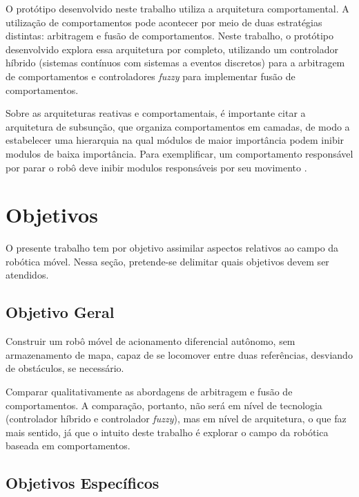 O protótipo desenvolvido neste trabalho utiliza a arquitetura comportamental. A 
utilização de comportamentos pode acontecer por meio de duas estratégias distintas: 
arbitragem e fusão de comportamentos. Neste trabalho, o protótipo desenvolvido
explora essa arquitetura por completo, utilizando um controlador híbrido (sistemas 
contínuos com sistemas a eventos discretos) para a arbitragem de comportamentos e 
controladores \textit{fuzzy} para implementar fusão de comportamentos.  

Sobre as arquiteturas reativas e comportamentais, é importante citar a arquitetura 
de subsunção, que organiza comportamentos em camadas, de modo a estabelecer uma 
hierarquia na qual módulos de maior importância podem inibir modulos de baixa 
importância. Para exemplificar, um comportamento responsável por parar o robô deve 
inibir modulos responsáveis por seu movimento \cite{Livro_Mataric}.

\section{Objetivos}

O presente trabalho tem por objetivo assimilar aspectos relativos ao campo da
robótica móvel. Nessa seção, pretende-se delimitar quais objetivos devem ser
atendidos.

	\subsection{Objetivo Geral}
	
	Construir um robô móvel de acionamento diferencial autônomo, sem
	armazenamento de mapa, capaz de se locomover entre duas referências, desviando
	de obstáculos, se necessário. 
	
	Comparar qualitativamente as abordagens de arbitragem e fusão de comportamentos. A 
	comparação, portanto, não será em nível de tecnologia (controlador híbrido e controlador
	\textit{fuzzy}), mas em nível de arquitetura, o que faz mais sentido, já que o intuito deste
	trabalho é explorar o campo da robótica baseada em comportamentos.
 	
	\subsection{Objetivos Específicos}
 

